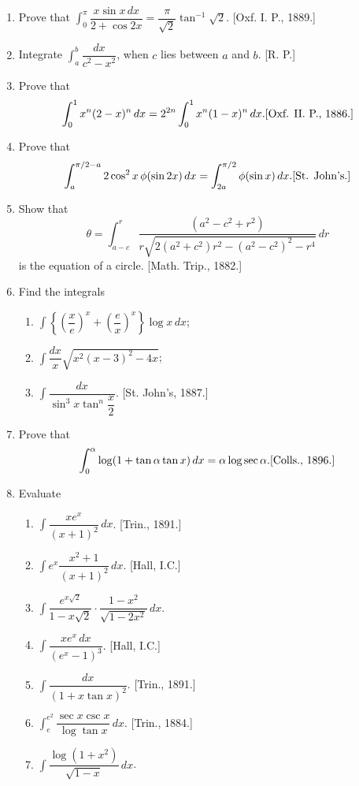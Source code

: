 \documentclass[11pt, a4paper]{article}
\newcommand{\source}[1]{\hfill\textnormal{[#1]}}
\begin{document}
\begin{enumerate}[leftmargin=2em]
\item Prove that $\displaystyle\int_0^\pi \dfrac{x\sin x\,dx}{2+\cos2x}=\dfrac{\pi}{\sqrt2}\tan^{-1}\sqrt2$. \source{Oxf. I. P., 1889.}

\item Integrate $\displaystyle\int_a^b \dfrac{dx}{c^2-x^2}$, when $c$ lies between $a$ and $b$. \source{R. P.}

\item Prove that
\[
\int_0^1 x^n(2-x)^n\,dx=2^{2n}\int_0^1 x^n(1-x)^n\,dx. \source{Oxf. II. P., 1886.}
\]

\item Prove that
\[
\int_a^{\pi/2-a} 2\cos^2x\,\phi(\sin2x)\,dx=\int_{2a}^{\pi/2}\phi(\sin x)\,dx. \source{St. John's.}
\]

\item Show that
\[
\theta=\int_{a-c}^r \dfrac{(a^2-c^2+r^2)}{r\sqrt{2(a^2+c^2)r^2-(a^2-c^2)^2-r^4}}\,dr
\]
is the equation of a circle. \source{Math. Trip., 1882.}

\item Find the integrals
\begin{enumerate}[label=(\alph*)]
\item $\displaystyle\int \left\{\left(\dfrac{x}{e}\right)^x+\left(\dfrac{e}{x}\right)^x\right\}\log x\,dx$;
\item $\displaystyle\int \dfrac{dx}{x}\sqrt{x^2(x-3)^2-4x}$;
\item $\displaystyle\int \dfrac{dx}{\sin^3x\tan^n\dfrac{x}{2}}$. \source{St. John's, 1887.}
\end{enumerate}

\item Prove that
\[
\int_0^\alpha \log(1+\tan\alpha\tan x)\,dx=\alpha\log\sec\alpha. \source{Colls., 1896.}
\]

\item Evaluate
\begin{enumerate}[label=(\roman*)]
\item $\displaystyle\int \dfrac{xe^x}{(x+1)^2}\,dx$. \source{Trin., 1891.}
\item $\displaystyle\int e^x\dfrac{x^2+1}{(x+1)^2}\,dx$. \source{Hall, I.C.}
\item $\displaystyle\int \dfrac{e^{x\sqrt2}}{1-x\sqrt2}\cdot\dfrac{1-x^2}{\sqrt{1-2x^2}}\,dx$.
\item $\displaystyle\int \dfrac{xe^x\,dx}{(e^x-1)^3}$. \source{Hall, I.C.}
\item $\displaystyle\int \dfrac{dx}{(1+x\tan x)^2}$. \source{Trin., 1891.}
\item $\displaystyle\int_e^{e^2} \dfrac{\sec x\csc x}{\log\tan x}\,dx$. \source{Trin., 1884.}
\item $\displaystyle\int \dfrac{\log(1+x^2)}{\sqrt{1-x}}\,dx$.
\end{enumerate}


\end{enumerate}
\end{document}
